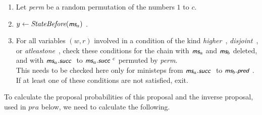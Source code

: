 \documentclass[a4paper,12pt,fleqn]{article}
\newcommand{\nnm}[1]{\textsf{\small\textit{#1}\ }}
\newcommand{\ms}{\textsl{\textsf{\small ms}}} %
\begin{document}
\begin{enumerate}
             any pair of two non-diagonal ministeps of the same \textit{Option}:
      \begin{enumerate}
      \item  define $\ms_f$ as the last ministep in $[\ms_a.\nnm{succ},  \ms_g]$
             such that all \textit{Options} of non-diagonal ministeps
             in $[\ms_a.\nnm{succ}, \ms_f]$ are distinct;
      \item  $c \leftarrow \min\{c, \textit{length}([\ms_a.\nnm{succ}, \ms_f]) - 1 \}$.
      \item[ ] (The permutation below will then affect only ministeps strictly before $\ms_f$;
             this will ensure that the permuted ministeps, together with $\ms_f$,
             all have distinct \textit{Options} and therefore the permutation cannot
             affect the number of CCPs.)
      \end{enumerate}
\item Let \textit{perm} be a random permutation of the numbers $1$ to $c$.
\item $y \leftarrow  \textit{StateBefore}(\ms_a)$ .
\item For all variables $(w,r)$ involved in a condition of the kind
      \nnm{higher}, \nnm{disjoint}, or \nnm{atleastone},
      check these conditions for the chain
      with   $\ms_a$ and $\ms_b$ deleted, and with
      $\ms_a.\nnm{succ}$ to $\ms_a.\nnm{succ}^c$  permuted by \textit{perm}.\\
      This needs to be checked
      here only for ministeps from $\ms_a.\nnm{succ}$ to $\ms_b.\nnm{pred}$.\\
      If at least one of these conditions are not satisfied, exit.
\end{enumerate}
To calculate the proposal probabilities of this proposal and the
inverse proposal, used in $pra$ below, we need to calculate the following.
\end{document}

